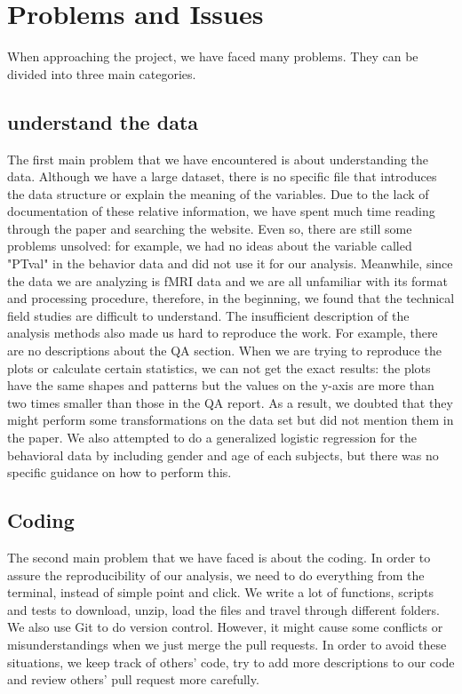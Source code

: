 \section{Problems and Issues}
\noindent
When approaching the project, we have faced many problems. They can be divided into three main categories.
\subsection{understand the data}
\noindent
The first main problem that we have encountered is about understanding the data. Although we have a large dataset, there is no specific file that introduces the data structure or explain the meaning of the variables. Due to the lack of documentation of these relative information, we have spent much time reading through the paper and searching the website. Even so, there are still some problems unsolved: for example, we had no ideas about the variable called "PTval" in the behavior data and did not use it for our analysis. Meanwhile, since the data we are analyzing is fMRI data and we are all unfamiliar with its format and processing procedure, therefore, in the beginning, we found that the technical field studies are difficult to understand. 
\noindent
The insufficient description of the analysis methods also made us hard to reproduce the work. For example,  there are no descriptions about the QA section. When we are trying to reproduce the plots or calculate certain statistics, we can not get the exact results: the plots have the same shapes and patterns but the values on the y-axis are more than two times smaller than those in the QA report. As a result, we doubted that they might perform some transformations on the data set but did not mention them in the paper. We also attempted to do a generalized logistic regression for the behavioral data by including gender and age of each subjects, but there was no specific guidance on how to perform this.

\subsection{Coding}
\noindent
The second main problem that we have faced is about the coding. In order to assure the reproducibility of our analysis, we need to do everything from the terminal, instead of simple point and click. We write a lot of functions, scripts and tests to download, unzip, load the files and travel through different folders.
\noindent
We also use Git to do version control. However, it might cause some conflicts or misunderstandings when we just merge the pull requests. In order to avoid these situations, we keep track of others’ code, try to add more descriptions to our code and review others' pull request more carefully.

